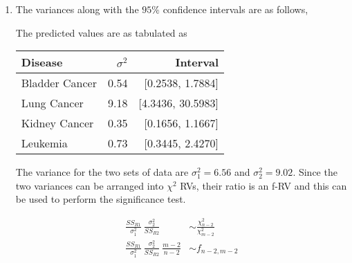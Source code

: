 \begin{enumerate}
\begin{figure}[H]
\begin{subfigure}[]{0.2\linewidth}
	\end{subfigure}
	\begin{subfigure}[]{0.8\linewidth}
		\centering
		
	\end{subfigure}
\end{figure}

\item The variances along with the $ 95\% $ confidence intervals are as follows,

The predicted values are as tabulated as
\begin{table}[H]
	\centering
	\begin{tabular}{@{}lrr@{}}
		\toprule
		Disease		& $ \sigma^2 $	& Interval \\
		\midrule
		Bladder Cancer	& 0.54	& [0.2538, 1.7884]\\
		Lung Cancer	& 9.18	& [4.3436, 30.5983]\\
		Kidney Cancer	& 0.35	& [0.1656, 1.1667]\\
		Leukemia	& 0.73	& [0.3445, 2.4270]\\
		\bottomrule
	\end{tabular}
\end{table}

The variance for the two sets of data are $ \sigma_1^2 = 6.56 $ and $ \sigma_2^2 = 9.02 $. Since the two variances can be arranged into $ \chi^2 $ RVs, their ratio is an f-RV and this can be used to perform the significance test.

\begin{align}
	\frac{SS_{R1}}{\sigma_1^2}\ \frac{\sigma_2^2}{SS_{R2}} &\sim \frac{\chi^2_{n-2}}{\chi^2_{m-2}} \nonumber \\
	\frac{SS_{R1}}{\sigma_1^2}\ \frac{\sigma_2^2}{SS_{R2}}\ \frac{m-2}{n-2} &\sim f_{n-2, m-2}
\end{align}


\end{enumerate}
